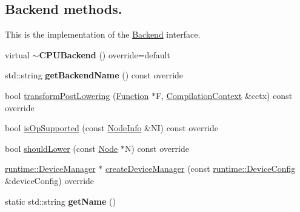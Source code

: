 \subsection*{Backend methods.}
\label{_amgrp74a5605ee0c2530d0af87631bd615b01}%
 This is the implementation of the \hyperlink{classglow_1_1_backend}{Backend} interface. \begin{DoxyCompactItemize}
\item 
\mbox{\label{classglow_1_1_c_p_u_backend_abaeddd31d4ab17dd1b98de5bb0e3c71b}} 
virtual {\bfseries $\sim$\+C\+P\+U\+Backend} () override=default
\item 
\mbox{\label{classglow_1_1_c_p_u_backend_a456b6dba3778003b1c1c68561d8e9b44}} 
std\+::string {\bfseries get\+Backend\+Name} () const override
\item 
bool \hyperlink{classglow_1_1_c_p_u_backend_ab6cd115b08df8fe8147a9818bfb36d90}{transform\+Post\+Lowering} (\hyperlink{classglow_1_1_function}{Function} $\ast$F, \hyperlink{structglow_1_1_compilation_context}{Compilation\+Context} \&cctx) const override
\item 
bool \hyperlink{classglow_1_1_c_p_u_backend_ab39d11a852bb99b35b52b3a8d50f82a0}{is\+Op\+Supported} (const \hyperlink{classglow_1_1_node_info}{Node\+Info} \&NI) const override
\item 
bool \hyperlink{classglow_1_1_c_p_u_backend_a09c56b421ac28d8cdf2c2a332b1caf77}{should\+Lower} (const \hyperlink{classglow_1_1_node}{Node} $\ast$N) const override
\item 
\hyperlink{classglow_1_1runtime_1_1_device_manager}{runtime\+::\+Device\+Manager} $\ast$ \hyperlink{classglow_1_1_c_p_u_backend_a038b765b85ac399a91437a82f044f28d}{create\+Device\+Manager} (const \hyperlink{structglow_1_1runtime_1_1_device_config}{runtime\+::\+Device\+Config} \&device\+Config) override
\item 
\mbox{\label{classglow_1_1_c_p_u_backend_a764bdde746ce946bfdcf9a5de7bb6452}} 
static std\+::string {\bfseries get\+Name} ()
\end{DoxyCompactItemize}
